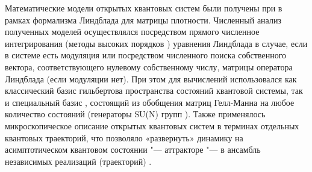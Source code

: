 {\methods} 
Математические модели открытых квантовых систем были получены при в рамках формализма Линдблада \autocite{Lindblad1976, Gorini1976, book2007} для матрицы плотности.
Численный анализ полученных моделей осуществлялся посредством прямого численное интегрирования (методы высоких порядков \autocite{Lambert1991}) уравнения Линдблада в случае, если в системе есть модуляция или посредством численного поиска собственного вектора, соответствующего нулевому собственному числу, матрицы оператора Линдблада (если модуляции нет). При этом для вычислений использовался как классический базис гильбертова пространства состояний квантовой системы, так и специальный базис \cite{Liniov2019}, состоящий из обобщения матриц Гелл-Манна \autocite{GellMann1962} на любое количество состояний \autocite{Lendi1987} (генераторы SU(N) групп \autocite{Georgi2018}).
Также применялось микроскопическое описание открытых квантовых систем в терминах отдельных квантовых траекторий, что позволяло  «развернуть» динамику на асимптотическом квантовом состоянии "--- аттракторе "--- в ансамбль независимых реализаций (траекторий) \autocite{Dalibard1992, Dum1992, Plenio1998, Volokitin2017}.

